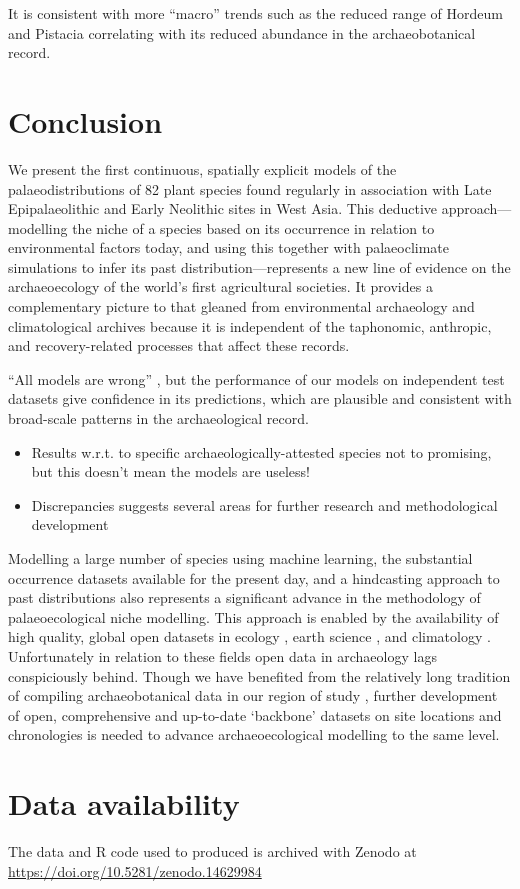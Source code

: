 \documentclass[
  authoryear,
  preprint]{elsarticle}
\providecommand{\tightlist}{%
  \setlength{\itemsep}{0pt}\setlength{\parskip}{0pt}}\usepackage{longtable,booktabs,array}
\begin{document}
It is consistent with more ``macro'' trends such as the reduced range of
Hordeum and Pistacia correlating with its reduced abundance in the
archaeobotanical record.

\section{Conclusion}\label{conclusion}

We present the first continuous, spatially explicit models of the
palaeodistributions of 82 plant species found regularly in association
with Late Epipalaeolithic and Early Neolithic sites in West Asia. This
deductive approach---modelling the niche of a species based on its
occurrence in relation to environmental factors today, and using this
together with palaeoclimate simulations to infer its past
distribution---represents a new line of evidence on the archaeoecology
of the world's first agricultural societies. It provides a complementary
picture to that gleaned from environmental archaeology and
climatological archives because it is independent of the taphonomic,
anthropic, and recovery-related processes that affect these records.

``All models are wrong'' \citep{Box1976}, but the performance of our
models on independent test datasets give confidence in its predictions,
which are plausible and consistent with broad-scale patterns in the
archaeological record.

\begin{itemize}
\tightlist
\item
  Results w.r.t. to specific archaeologically-attested species not to
  promising, but this doesn't mean the models are useless!
\item
  Discrepancies suggests several areas for further research and
  methodological development
\end{itemize}

Modelling a large number of species using machine learning, the
substantial occurrence datasets available for the present day, and a
hindcasting approach to past distributions also represents a significant
advance in the methodology of palaeoecological niche modelling. This
approach is enabled by the availability of high quality, global open
datasets in ecology \citep{GBIF2025, GBIFSecretariat2023}, earth science
\citep{SRTM}, and climatology \citep{KargerEtAl2017, BrownEtAl2018}.
Unfortunately in relation to these fields open data in archaeology lags
conspiciously behind. Though we have benefited from the relatively long
tradition of compiling archaeobotanical data in our region of study
\citep{ColledgeEtAl2004, ShennanConolly2007, ADEMNES, LucasFuller2018, FullerEtAl2018, WallaceEtAl2018, ORIGINS},
further development of open, comprehensive and up-to-date `backbone'
datasets on site locations and chronologies is needed to advance
archaeoecological modelling to the same level.

\section{Data availability}\label{data-availability}

The data and R code used to produced is archived with Zenodo at
\url{https://doi.org/10.5281/zenodo.14629984}


\renewcommand\refname{References}
  
\end{document}
